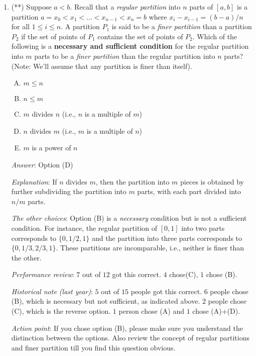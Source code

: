 \documentclass[10pt]{amsart}
\begin{document}
\begin{enumerate}
\item (**) Suppose $a < b$. Recall that a {\em regular partition}
  into $n$ parts of $[a,b]$ is a partition $a = x_0 < x_1 < \dots <
  x_{n-1} < x_n = b$ where $x_i - x_{i-1} = (b - a)/n$ for all $1 \le
  i \le n$. A partition $P_1$ is said to be a {\em finer partition}
  than a partition $P_2$ if the set of points of $P_1$ contains the
  set of points of $P_2$. Which of the following is a {\bf necessary
  and sufficient condition} for the regular partition into $m$ parts
  to be a {\em finer partition} than the regular partition into $n$
  parts? (Note: We'll assume that any partition is finer than itself).

  \begin{enumerate}[(A)]
  \item $m \le n$
  \item $n \le m$
  \item $m$ divides $n$ (i.e., $n$ is a multiple of $m$)
  \item $n$ divides $m$ (i.e., $m$ is a multiple of $n$)
  \item $m$ is a power of $n$
  \end{enumerate}

  {\em Answer}: Option (D)

  {\em Explanation}: If $n$ divides $m$, then the partition into $m$
  pieces is obtained by further subdividing the partition into $m$
  parts, with each part divided into $n/m$ parts.

  {\em The other choices}: Option (B) is a {\em necessary} condition
  but is not a sufficient condition. For instance, the regular
  partition of $[0,1]$ into two parts corresponds to $\{ 0, 1/2, 1 \}$
  and the partition into three parts corresponds to $\{ 0, 1/3, 2/3, 1
  \}$. These partitions are incomparable, i.e., neither is finer than
  the other.

  {\em Performance review}: $7$ out of $12$ got this correct. $4$
  chose(C), $1$ chose (B).

  {\em Historical note (last year)}: $5$ out of $15$ people got this
  correct. $6$ people chose (B), which is necessary but not
  sufficient, as indicated above. $2$ people chose (C), which is the
  reverse option. $1$ person chose (A) and $1$ chose (A)+(D).

  {\em Action point}: If you chose option (B), please make sure you
  understand the distinction between the options. Also review the
  concept of regular partitions and finer partition till you find this
  question obvious.


\end{enumerate}
\end{document}

